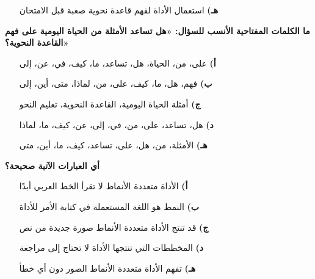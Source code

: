 \documentclass[11pt,a4paper]{article}
\begin{document}
\begin{multicols}{2}
\begin{minipage}{\linewidth}
\begin{itemize}[leftmargin=0.95cm, labelsep=4pt, itemsep=0pt, topsep=2pt, parsep=0pt]
  \item[\textbf{هـ)}] استعمال الأداة لفهم قاعدة نحوية صعبة قبل الامتحان
\end{itemize}
\end{minipage}\par\vspace{7pt plus 4pt}
\noindent\begin{minipage}{\linewidth}
\hangindent=0.7cm\textbf{ما الكلمات المفتاحية الأنسب للسؤال: «هل تساعد الأمثلة من الحياة اليومية على فهم القاعدة النحوية؟»}
\begin{itemize}[leftmargin=0.95cm, labelsep=4pt, itemsep=0pt, topsep=2pt, parsep=0pt]
  \item[\textbf{أ)}] على، من، الحياة، هل، تساعد، ما، كيف، في، عن، إلى
  \item[\textbf{ب)}] فهم، هل، ما، كيف، على، من، لماذا، متى، أين، إلى
  \item[\textbf{ج)}] أمثلة الحياة اليومية، القاعدة النحوية، تعليم النحو
  \item[\textbf{د)}] هل، تساعد، على، من، في، إلى، عن، كيف، ما، لماذا
  \item[\textbf{هـ)}] الأمثلة، من، هل، على، تساعد، كيف، ما، أين، متى
\end{itemize}
\end{minipage}\par\vspace{7pt plus 4pt}
\noindent\begin{minipage}{\linewidth}
\hangindent=0.7cm\textbf{أي العبارات الآتية صحيحة؟}
\begin{itemize}[leftmargin=0.95cm, labelsep=4pt, itemsep=0pt, topsep=2pt, parsep=0pt]
  \item[\textbf{أ)}] الأداة متعددة الأنماط لا تقرأ الخط العربي أبدًا
  \item[\textbf{ب)}] النمط هو اللغة المستعملة في كتابة الأمر للأداة
  \item[\textbf{ج)}] قد تنتج الأداة متعددة الأنماط صورة جديدة من نص
  \item[\textbf{د)}] المخططات التي تنتجها الأداة لا تحتاج إلى مراجعة
  \item[\textbf{هـ)}] تفهم الأداة متعددة الأنماط الصور دون أي خطأ
\end{itemize}
\end{minipage}\par\vspace{7pt plus 4pt}
\end{multicols}
\vfill
\end{document}
